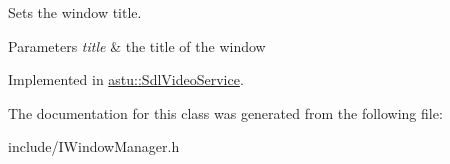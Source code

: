 Sets the window title.


\begin{DoxyParams}{Parameters}
{\em title} & the title of the window \\
\hline
\end{DoxyParams}


Implemented in \hyperlink{classastu_1_1SdlVideoService_aad3c873db481dd622d6ddcea70b279af}{astu\+::\+Sdl\+Video\+Service}.



The documentation for this class was generated from the following file\+:\begin{DoxyCompactItemize}
\item 
include/I\+Window\+Manager.\+h\end{DoxyCompactItemize}
